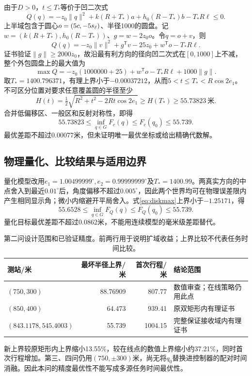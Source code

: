 \documentclass[UTF8,a4paper,zihao=-4,fontset=mac]{ctexart}
\begin{document}
由于$D>0$，$t\le T_*$等价于凹二次式
\begin{equation}\label{eq:quadratic}
Q(q)=-z_0\|q\|^2+k(R+T_*)a+h_0(R-T_*)b-T_*R\ell\le0.
\end{equation}
上半域包含于圆心$o=(5c,-5s_{\bar\varepsilon})$、半径1000的圆盘。记$w=(k(R+T_*),h_0(R-T_*))$、$g=w-2z_0o$。令$q=o+v$，则
\begin{equation}
Q(q)=-z_0\|v\|^2+g^\mathsf Tv-25z_0+w^\mathsf To-T_*R\ell.
\end{equation}
证书验证$\|g\|\ge2000z_0$，故沿最有利方向的径向凹二次式在$[0,1000]$上不减，整个外包圆盘上的最大值为
\begin{equation}\label{eq:diskmax}
\max Q=-z_0(1000000+25)+w^\mathsf To-T_*R\ell+1000\|g\|.
\end{equation}
取$T_*=1400.796371$，有理上界小于$-0.00037212$，从而$5<t\le T_*<R\cos2e_1$。不可区分位置对要求任意覆盖圆的半径至少
\begin{equation}
H(t)=\tfrac12\sqrt{R^2+t^2-2Rt\cos2e_1}\ge H(T_*)\ge55.73823\ \text{米}.
\end{equation}
合并低偏移区、一般区和反射对称性，即得
\begin{equation}\label{eq:continuousbound}
\boxed{55.73823\le\inf_{q\in G}F_c(q)\le F_c(q_0)\le55.739.}
\end{equation}
最优差距不超过0.00077米，但未证明唯一最优坐标或给出精确代数解。

\subsection{物理量化、比较结果与适用边界}
量化模型改用$e_1=1.00499999^\circ,e_2=0.99999999^\circ$及$T_*=1400.99$。两真实方向的中点舍入到最近$0.01^\circ$后，角度偏移不超过$0.005^\circ$，因此两个世界均可在物理误差限内产生相同显示角；微小内缩避开平局舍入。式\eqref{eq:diskmax}上界小于$-1.25171$，得
\begin{equation}\label{eq:quantbound}
\boxed{55.6528\le\inf_{q\in G}F_Q(q)\le F_Q(q_0)\le55.739.}
\end{equation}
量化目标最优差距不超过0.0862米，不能用连续模型的毫米级差距替代。

\begin{table}[H]\centering\small
\caption{第二问设计范围和已验证精度。前两行用于说明扩域收益；上界比较不代表任务时间比较。}\label{tab:q2}
\begin{tabular}{lrrp{5.2cm}}\toprule
测站/米 & 最坏半径上界/米 & 首次行程/米 & 结论范围\\\midrule
$(750,300)$ &88.76909&807.77&数值审查；在线策略仍用此点\\
$(850,400)$ &64.473&939.41&原双矩形内有理证书\\
$(843.1178,545.4003)$ &55.739&1004.15&完整保证接收域内有理证书\\\bottomrule
\end{tabular}
\end{table}
新上界较原矩形内上界缩小13.55\%，较在线点的数值上界缩小约37.21\%，同时首次行程增加。第三、四问仍用$(750,\pm300)$米，尚无将$q_0$替换进控制器的配对时间消融。因此本问的精度最优性不能写成多源任务时间最优性。
\end{document}
